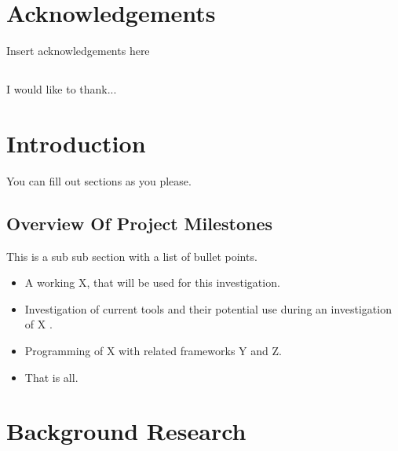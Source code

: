\documentclass[12pt,a4paper]{article}
\begin{document}


\pagebreak

\pagebreak

\begin{abstract}
\end{abstract}
\pagebreak

\tableofcontents %
\newpage

\listoftables
\newpage

\listoffigures
\newpage

\section*{Acknowledgements}
Insert acknowledgements here
\subsection*{}
	I would like to thank...
\newpage


\section{Introduction}
You can fill out sections as you please.


\subsection{Overview Of Project Milestones}

This is a sub sub section with a list of bullet points.
\begin{itemize}\itemsep0pt
	\item A working X, that will be used for this investigation.
	\item Investigation of current tools and their potential use during an investigation of X .
	\item Programming of X with related frameworks Y and Z.
	\item That is all.
\end{itemize}


\section{Background Research}
\end{document}
